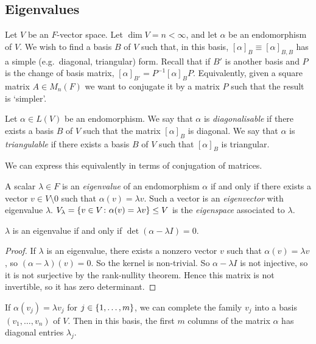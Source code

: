 \subsection{Eigenvalues}
Let \( V \) be an \( F \)-vector space.
Let \( \dim V = n < \infty \), and let \( \alpha \) be an endomorphism of \( V \).
We wish to find a basis \( B \) of \( V \) such that, in this basis, \( [\alpha]_B \equiv [\alpha]_{B,B} \) has a simple (e.g.\ diagonal, triangular) form.
Recall that if \( B' \) is another basis and \( P \) is the change of basis matrix, \( [\alpha]_{B'} = P^{-1} [\alpha]_B P \).
Equivalently, given a square matrix \( A \in M_n(F) \) we want to conjugate it by a matrix \( P \) such that the result is `simpler'.
\begin{definition}
	Let \( \alpha \in L(V) \) be an endomorphism.
	We say that \( \alpha \) is \textit{diagonalisable} if there exists a basis \( B \) of \( V \) such that the matrix \( [\alpha]_B \) is diagonal.
	We say that \( \alpha \) is \textit{triangulable} if there exists a basis \( B \) of \( V \) such that \( [\alpha]_B \) is triangular.
\end{definition}
\begin{remark}
	We can express this equivalently in terms of conjugation of matrices.
\end{remark}
\begin{definition}
	A scalar \( \lambda \in F \) is an \textit{eigenvalue} of an endomorphism \( \alpha \) if and only if there exists a vector \( v \in V \setminus \qty{0} \) such that \( \alpha(v) = \lambda v \).
	Such a vector is an \textit{eigenvector} with eigenvalue \( \lambda \).
	\( V_\lambda = \qty{ v \in V \colon \alpha(v) = \lambda v } \leq V \) is the \textit{eigenspace} associated to \( \lambda \).
\end{definition}
\begin{lemma}
	\( \lambda \) is an eigenvalue if and only if \( \det(\alpha - \lambda I) = 0 \).
\end{lemma}
\begin{proof}
	If \( \lambda \) is an eigenvalue, there exists a nonzero vector \( v \) such that \( \alpha(v) = \lambda v \), so \( (\alpha - \lambda)(v) = 0 \).
	So the kernel is non-trivial.
	So \( \alpha - \lambda I \) is not injective, so it is not surjective by the rank-nullity theorem.
	Hence this matrix is not invertible, so it has zero determinant.
\end{proof}
\begin{remark}
	If \( \alpha(v_j) = \lambda v_j \) for \( j \in \qty{1, \dots, m} \), we can complete the family \( v_j \) into a basis \( (v_1, \dots, v_n) \) of \( V \).
	Then in this basis, the first \( m \) columns of the matrix \( \alpha \) has diagonal entries \( \lambda_j \).
\end{remark}

